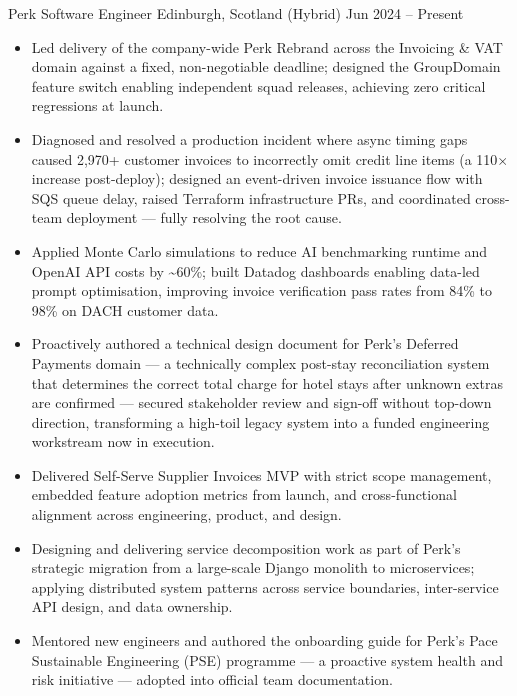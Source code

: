 
  \cventry
    {Perk} %
    {Software Engineer} %
    {Edinburgh, Scotland (Hybrid)} %
    {Jun 2024 – Present} %
    {
      \begin{itemize}
        \item Led delivery of the company-wide Perk Rebrand across the Invoicing \& VAT domain against a fixed, non-negotiable deadline; designed the GroupDomain feature switch enabling independent squad releases, achieving zero critical regressions at launch.
        \item Diagnosed and resolved a production incident where async timing gaps caused 2,970+ customer invoices to incorrectly omit credit line items (a 110$\times$ increase post-deploy); designed an event-driven invoice issuance flow with SQS queue delay, raised Terraform infrastructure PRs, and coordinated cross-team deployment — fully resolving the root cause.
        \item Applied Monte Carlo simulations to reduce AI benchmarking runtime and OpenAI API costs by \textasciitilde60\%; built Datadog dashboards enabling data-led prompt optimisation, improving invoice verification pass rates from 84\% to 98\% on DACH customer data.
        \item Proactively authored a technical design document for Perk's Deferred Payments domain — a technically complex post-stay reconciliation system that determines the correct total charge for hotel stays after unknown extras are confirmed — secured stakeholder review and sign-off without top-down direction, transforming a high-toil legacy system into a funded engineering workstream now in execution.
        \item Delivered Self-Serve Supplier Invoices MVP with strict scope management, embedded feature adoption metrics from launch, and cross-functional alignment across engineering, product, and design.
        \item Designing and delivering service decomposition work as part of Perk's strategic migration from a large-scale Django monolith to microservices; applying distributed system patterns across service boundaries, inter-service API design, and data ownership.
        \item Mentored new engineers and authored the onboarding guide for Perk's Pace Sustainable Engineering (PSE) programme — a proactive system health and risk initiative — adopted into official team documentation.
      \end{itemize}
    }
